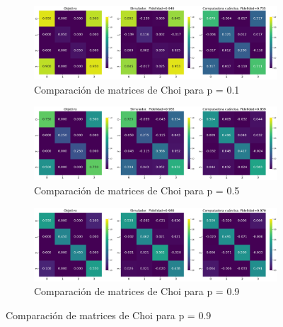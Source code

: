 \documentclass[letterpaper,12pt]{thesisECFM}
\theoremstyle{plain}
\theoremstyle{definition}
\theoremstyle{remark}
\newcommand{\1}{\mathbb{1}}
\begin{document}
\begin{figure}[h!]
    \centering
    \begin{subfigure}{\textwidth}
        \centering
        \includegraphics[width=1\linewidth]{imagenes/comp_choi_p0.1.png}
        \caption{Comparación de matrices de Choi para p = 0.1}
        \label{fig:choi_p0.1}
    \end{subfigure}
    \vspace{1em} %
    
   
    \begin{subfigure}{\textwidth}
        \centering
        \includegraphics[width=1\linewidth]{imagenes/comp_choi_p0.5.png}
        \caption{Comparación de matrices de Choi para p = 0.5}
        \label{fig:choi_p0.5}
    \end{subfigure}
    \vspace{1em}
    
    \begin{subfigure}{\textwidth}
        \centering
        \includegraphics[width=1\linewidth]{imagenes/comp_choi_p0.9.png}
        \caption{Comparación de matrices de Choi para p = 0.9}
        \label{fig:choi_p0.9}
    \end{subfigure}
    

\end{figure}
\end{document}
